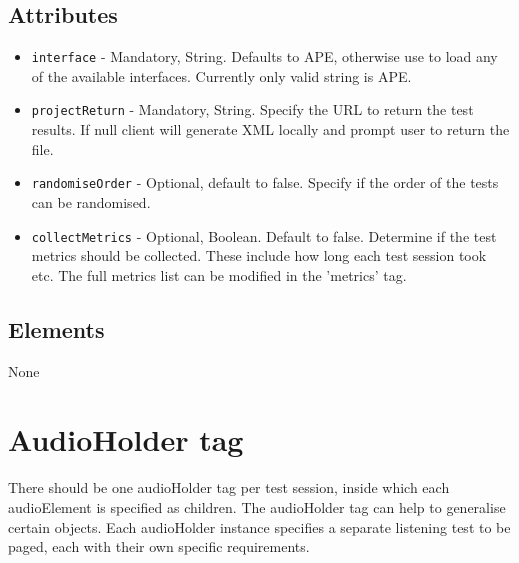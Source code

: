 \documentclass{article}
\begin{document}
\subsection{Attributes}
\begin{itemize}
\item \texttt{interface} - Mandatory, String. Defaults to APE, otherwise use to load any of the available interfaces. Currently only valid string is APE.
\item \texttt{projectReturn} - Mandatory, String. Specify the URL to return the test results. If null client will generate XML locally and prompt user to return the file.
\item \texttt{randomiseOrder} - Optional, default to false. Specify if the order of the tests can be randomised.
\item \texttt{collectMetrics} - Optional, Boolean. Default to false. Determine if the test metrics should be collected. These include how long each test session took etc. The full metrics list can be modified in the 'metrics' tag.
\end{itemize}

\subsection{Elements}
None

\section{AudioHolder tag}

There should be one audioHolder tag per test session, inside which each audioElement is specified as children. The audioHolder tag can help to generalise certain objects. Each audioHolder instance specifies a separate listening test to be paged, each with their own specific requirements.
\end{document}
